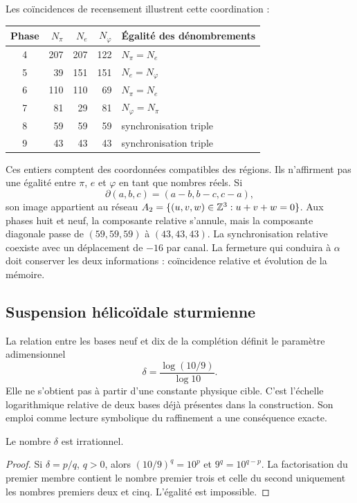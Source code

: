 Les coïncidences de recensement illustrent cette coordination :
\begin{center}
\begin{tabular}{@{}c rrr l@{}}\toprule
Phase&\(N_\pi\)&\(N_e\)&\(N_\varphi\)&Égalité des dénombrements\\\midrule
4&207&207&122&\(N_\pi=N_e\)\\
5&39&151&151&\(N_e=N_\varphi\)\\
6&110&110&69&\(N_\pi=N_e\)\\
7&81&29&81&\(N_\varphi=N_\pi\)\\
8&59&59&59&synchronisation triple\\
9&43&43&43&synchronisation triple\\\bottomrule
\end{tabular}
\end{center}
Ces entiers comptent des coordonnées compatibles des régions. Ils n'affirment pas une égalité entre \(\pi\), \(e\) et \(\varphi\) en tant que nombres réels. Si
\[
 \partial(a,b,c)=(a-b,b-c,c-a),
\]
son image appartient au réseau \(A_2=\{(u,v,w)\in\mathbb Z^3:u+v+w=0\}\). Aux phases huit et neuf, la composante relative s'annule, mais la composante diagonale passe de \((59,59,59)\) à \((43,43,43)\). La synchronisation relative coexiste avec un déplacement de \(-16\) par canal. La fermeture qui conduira à \(\alpha\) doit conserver les deux informations : coïncidence relative et évolution de la mémoire.

\subsection{Suspension hélicoïdale sturmienne}

La relation entre les bases neuf et dix de la complétion définit le paramètre adimensionnel
\begin{equation}
 \delta=\frac{\log(10/9)}{\log10}.
 \label{eq:delta-sturm}
\end{equation}
Elle ne s'obtient pas à partir d'une constante physique cible. C'est l'échelle logarithmique relative de deux bases déjà présentes dans la construction. Son emploi comme lecture symbolique du raffinement a une conséquence exacte.

\begin{lemma}
Le nombre \(\delta\) est irrationnel.
\end{lemma}
\begin{proof}
Si \(\delta=p/q\), \(q>0\), alors \((10/9)^q=10^p\) et \(9^q=10^{q-p}\). La factorisation du premier membre contient le nombre premier trois et celle du second uniquement les nombres premiers deux et cinq. L'égalité est impossible.
\end{proof}

